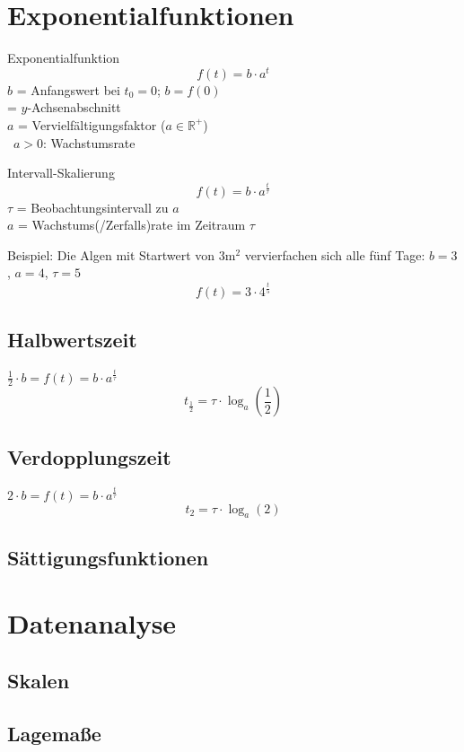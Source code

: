 \begin{multicols}{2}
\section{Exponentialfunktionen}
\begin{gesetz}{Exponentialfunktion}{}
$$f(t) = b\cdot{}a^t$$
$b$ = Anfangswert bei $t_0=0$; $b=f(0)$\\
\phantom{$b$} = $y$-Achsenabschnitt\\
$a$ = Vervielfältigungsfaktor ($a\in\mathbb{R}^{+}$)\\\
$a>0$: Wachstumsrate\\
\end{gesetz}


\begin{rezept}{Intervall-Skalierung}{}
$$f(t) = b\cdot{}a^{\frac{t}{\tau}}$$
$\tau$ = Beobachtungsintervall zu $a$\\
$a$ = Wachstums(/Zerfalls)rate im Zeitraum $\tau$
\end{rezept}

Beispiel: Die Algen mit Startwert von $3\textrm{m}^2$ vervierfachen
sich alle fünf Tage: $b=3$, $a=4$, $\tau=5$
$$f(t)= 3\cdot{}4^\frac{t}{5}$$

\subsection{Halbwertszeit}
$\frac12 \cdot{} b = f(t) = b\cdot{}a^{\frac{t}{\tau}}$
$$t_{\frac12} = \tau\cdot{}\log_a(\frac12)$$

\subsection{Verdopplungszeit}
$2\cdot{}b = f(t) = b\cdot{}a^{\frac{t}{\tau}}$
$$t_{2} = \tau\cdot{}\log_a(2)$$

\subsection{Sättigungsfunktionen}

\section{Datenanalyse}

\subsection{Skalen}

\subsection{Lagemaße}


\end{multicols}
